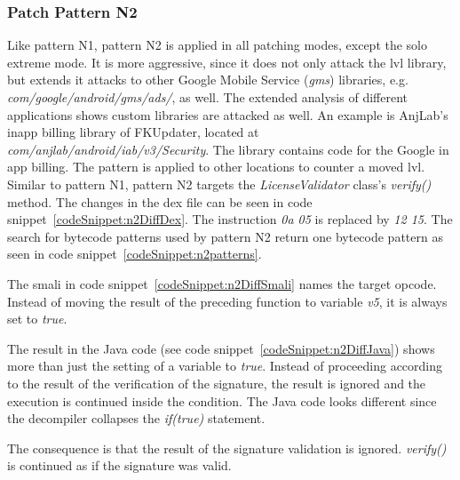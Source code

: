\subsubsection{Patch Pattern N2}
Like pattern N1, pattern N2 is applied in all patching modes, except the solo extreme mode.
It is more aggressive, since it does not only attack the \gls{lvl} library, but extends it attacks to other Google Mobile Service (\textit{gms}) libraries, e.g.  \textit{com/google/android/gms/ads/}, as well.
The extended analysis of different applications shows custom libraries are attacked as well.
An example is AnjLab's inapp billing library \cite{inappBilling} of FKUpdater, located at \textit{com/anjlab/android/iab/v3/Security}.
The library contains code for the Google in app billing.
The pattern is applied to other locations to counter a moved \gls{lvl}.
Similar to pattern N1, pattern N2 targets the \textit{LicenseValidator} class's \textit{verify()} method.
\newline
The changes in the \gls{dex} file can be seen in code snippet~\ref{codeSnippet:n2DiffDex}.
The instruction \textit{0a 05} is replaced by \textit{12 15}.
\newline
The search for bytecode patterns used by pattern N2 return one bytecode pattern as seen in code snippet~\ref{codeSnippet:n2patterns}.
\newline

The smali in code snippet~\ref{codeSnippet:n2DiffSmali} names the target opcode.
Instead of moving the result of the preceding function to variable \textit{v5}, it is always set to \textit{true}.
\newline

The result in the Java code (see code snippet~\ref{codeSnippet:n2DiffJava}) shows more than just the setting of a variable to \textit{true}.
Instead of proceeding according to the result of the verification of the signature, the result is ignored and the execution is continued inside the condition.
The Java code looks different since the decompiler collapses the \textit{if(true)} statement.
\newline

The consequence is that the result of the signature validation is ignored.
\textit{verify()} is continued as if the signature was valid.

